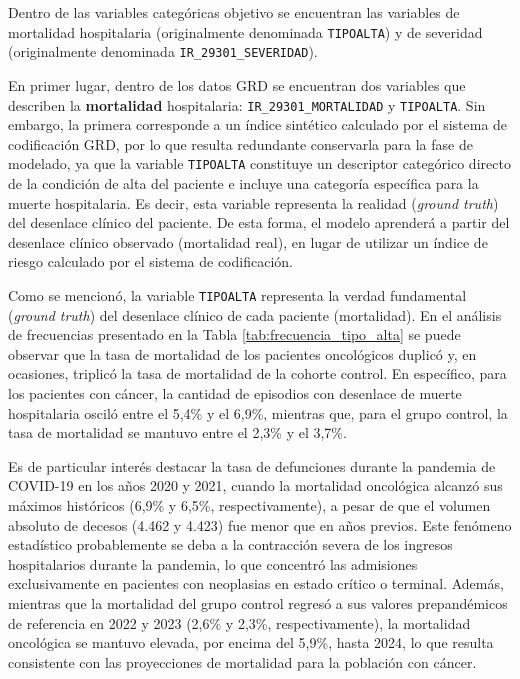 Dentro de las variables categóricas objetivo se encuentran las variables de mortalidad hospitalaria (originalmente denominada \texttt{TIPOALTA}) y de severidad (originalmente denominada \texttt{IR\_29301\_SEVERIDAD}).

En primer lugar, dentro de los datos GRD se encuentran dos variables que describen la \textbf{mortalidad} hospitalaria: \texttt{IR\_29301\_MORTALIDAD} y \texttt{TIPOALTA}. Sin embargo, la primera corresponde a un índice sintético calculado por el sistema de codificación GRD, por lo que resulta redundante conservarla para la fase de modelado, ya que la variable \texttt{TIPOALTA} constituye un descriptor categórico directo de la condición de alta del paciente e incluye una categoría específica para la muerte hospitalaria. Es decir, esta variable representa la realidad (\textit{ground truth}) del desenlace clínico del paciente. De esta forma, el modelo aprenderá a partir del desenlace clínico observado (mortalidad real), en lugar de utilizar un índice de riesgo calculado por el sistema de codificación.

Como se mencionó, la variable \texttt{TIPOALTA} representa la verdad fundamental (\textit{ground truth}) del desenlace clínico de cada paciente (mortalidad). En el análisis de frecuencias presentado en la Tabla \ref{tab:frecuencia_tipo_alta} se puede observar que la tasa de mortalidad de los pacientes oncológicos duplicó y, en ocasiones, triplicó la tasa de mortalidad de la cohorte control. En específico, para los pacientes con cáncer, la cantidad de episodios con desenlace de muerte hospitalaria osciló entre el 5,4\% y el 6,9\%, mientras que, para el grupo control, la tasa de mortalidad se mantuvo entre el 2,3\% y el 3,7\%.

Es de particular interés destacar la tasa de defunciones durante la pandemia de COVID-19 en los años 2020 y 2021, cuando la mortalidad oncológica alcanzó sus máximos históricos (6,9\% y 6,5\%, respectivamente), a pesar de que el volumen absoluto de decesos (4.462 y 4.423) fue menor que en años previos. Este fenómeno estadístico probablemente se deba a la contracción severa de los ingresos hospitalarios durante la pandemia, lo que concentró las admisiones exclusivamente en pacientes con neoplasias en estado crítico o terminal. Además, mientras que la mortalidad del grupo control regresó a sus valores prepandémicos de referencia en 2022 y 2023 (2,6\% y 2,3\%, respectivamente), la mortalidad oncológica se mantuvo elevada, por encima del 5,9\%, hasta 2024, lo que resulta consistente con las proyecciones de mortalidad para la población con cáncer.

